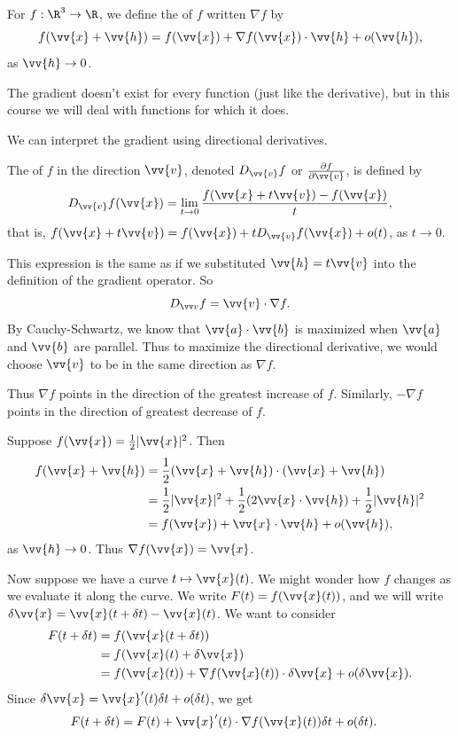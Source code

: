 \begin{definition}[Gradient]
	For $f : \R^3 \rightarrow \R$, we define the  of $f$ written $\nabla f$ by
	$$
	f(\vv{x} + \vv{h}) = f(\vv{x}) + \nabla f(\vv{x}) \cdot \vv{h} + o(\vv{h}),
	$$
	as $\vv{h} \rightarrow 0$.
\end{definition}

The gradient doesn't exist for every function (just like the derivative), but in this course we will deal with functions for which it does.

We can interpret the gradient using directional derivatives.
\begin{definition}
	The  of $f$ in the direction $\vv{v}$, denoted $D_{\vv{v}} f$ or $\frac{\partial f}{\partial \vv{v}}$, is defined by
	$$
	D_{\vv{v}} f(\vv{x}) = \lim_{t\to 0} \frac{f(\vv{x} + t \vv{v}) - f(\vv{x})}{t},
	$$
	that is, $f(\vv{x} + t \vv{v}) = f(\vv{x}) + t D_{\vv{v}} f(\vv{x}) + o(t)$, as $t \rightarrow 0$.
\end{definition}

This expression is the same as if we substituted  $\vv{h} = t \vv{v}$ into the definition of the gradient operator.
So
$$
D_{\vv v} f = \vv{v} \cdot \nabla f.
$$
By Cauchy-Schwartz, we know that $\vv{a} \cdot \vv{b}$ is maximized when $\vv{a}$ and $\vv{b}$ are parallel. Thus to maximize the directional derivative, we would choose $\vv{v}$ to be in the same direction as $\nabla f$.

Thus $\nabla f$ points in the direction of the greatest increase of $f$.  Similarly, $- \nabla f$ points in the direction of greatest decrease of $f$.

\begin{example}
	Suppose $f(\vv{x}) = \frac{1}{2}| \vv{x}|^2$. Then
	\begin{align*}
		f(\vv{x} + \vv{h}) &= \frac{1}{2}(\vv{x} + \vv{h}) \cdot (\vv{x} + \vv{h})\\
		&= \frac{1}{2} |\vv{x}|^2 + \frac{1}{2}(2 \vv{x} \cdot \vv{h}) + \frac{1}{2}|\vv{h}|^2 \\
		&= f(\vv{x}) + \vv{x}\cdot \vv{h} + o(\vv{h}),
	\end{align*}
	as $\vv{h} \rightarrow 0$. Thus $\nabla f(\vv{x}) = \vv{x}$.
\end{example}

Now suppose we have a curve $t \mapsto \vv{x}(t)$. We might wonder how $f$ changes as we evaluate it along the curve. We write $F(t) = f(\vv{x}(t))$, and we will write $\delta \vv{x} = \vv{x}(t + \delta t) - \vv{x}(t)$. We want to consider 
\begin{align*}
	F(t + \delta t) &= f(\vv{x}(t + \delta t))\\
	 &= f(\vv{x}(t) + \delta 
	 \vv{x}) \\
	 &= f(\vv{x}(t)) + \nabla f(\vv{x}(t)) \cdot \delta \vv{x} + o(\delta \vv{x}). 
\end{align*}
Since $\delta \vv{x} = \vv{x}'(t) \delta t + o(\delta t)$, we get
\begin{align*}
	F(t + \delta t) &= F(t) + \vv{x}'(t) \cdot \nabla f(\vv{x}(t)) \delta t + o(\delta t).
\end{align*}

